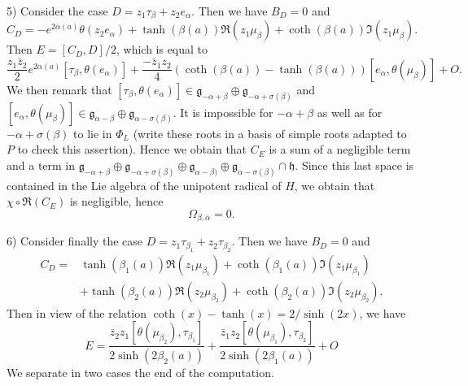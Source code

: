 \documentclass{amsart}
\theoremstyle{definition}
\begin{document}
5) 
Consider the case $D=z_1\tau_{\beta}+z_2e_{\alpha}$.
Then we have $B_D=0$ and  
\[
C_D=-e^{2\alpha(a)}\theta(z_2e_{\alpha})+
\tanh(\beta(a))\Re(z_1\mu_{\beta}) +
\coth(\beta(a))\Im(z_1\mu_{\beta}).
\]
Then $E=[C_D,D]/2$, 
which is equal to
\[
\frac{z_1\bar{z}_2}{2}e^{2\alpha(a)}[\tau_{\beta},\theta(e_{\alpha})]
+\frac{-\bar{z}_1z_2}{4}(\coth(\beta(a))-\tanh(\beta(a)))[e_{\alpha},\theta(\mu_{\beta})] +O.
\]
We then remark that 
$[\tau_{\beta},\theta(e_{\alpha})]\in 
\mathfrak{g}_{-\alpha+\beta}\oplus\mathfrak{g}_{-\alpha+\sigma(\beta)}$
and 
$[e_{\alpha},\theta(\mu_{\beta})]\in 
\mathfrak{g}_{\alpha-\beta}\oplus\mathfrak{g}_{\alpha-\sigma(\beta)}$.
It is impossible for $-\alpha+\beta$ as well as for 
$-\alpha+\sigma(\beta)$ to lie in $\Phi_L$ (write these roots in a basis of 
simple roots adapted to $P$ to check this assertion).
Hence we obtain that $C_E$ is a sum of a negligible term and 
a term in 
$\mathfrak{g}_{-\alpha+\beta}\oplus\mathfrak{g}_{-\alpha+\sigma(\beta)}
\oplus \mathfrak{g}_{\alpha-\beta)}\oplus\mathfrak{g}_{\alpha-\sigma(\beta)} \cap \mathfrak{h}$.
Since this last space is contained in the Lie algebra of the unipotent 
radical of $H$, we obtain that $\chi\circ\Re(C_E)$ is negligible,
hence
\[
\Omega_{\beta,\bar{\alpha}}=0.
\]

6) 
Consider finally the case $D=z_1\tau_{\beta_1}+z_2\tau_{\beta_2}$.
Then we have $B_D=0$ and  
\begin{align*}
C_D = &
\tanh(\beta_1(a))\Re(z_1\mu_{\beta_1}) +
\coth(\beta_1(a))\Im(z_1\mu_{\beta_1}) \\
& +\tanh(\beta_2(a))\Re(z_2\mu_{\beta_2}) +
\coth(\beta_2(a))\Im(z_2\mu_{\beta_2}).
\end{align*}
Then in view of the relation $\coth(x)-\tanh(x)=2/\sinh(2x)$, we have 
\[E= 
\frac{\bar{z}_2z_1[\theta(\mu_{\beta_2}),\tau_{\beta_1}]}{2\sinh(2\beta_2(a))} 
 +\frac{\bar{z}_1z_2[\theta(\mu_{\beta_1}),\tau_{\beta_2}]}{2\sinh(2\beta_1(a))} +O
\]
We separate in two cases the end of the computation.
\end{document}
